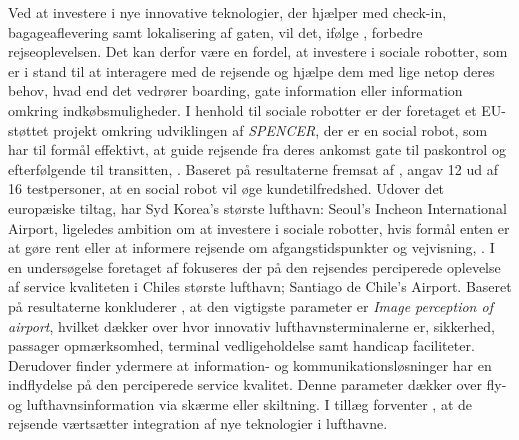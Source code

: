 Ved at investere i nye innovative teknologier, der hjælper med check-in, bagageaflevering samt lokalisering af gaten, vil det, ifølge \textcite[s. 352]{PDF:TheImpactOfTraveler}, forbedre rejseoplevelsen. Det kan derfor være en fordel, at investere i sociale robotter, som er i stand til at interagere med de rejsende og hjælpe dem med lige netop deres behov, hvad end det vedrører boarding, gate information eller information omkring indkøbsmuligheder. I henhold til sociale robotter er der foretaget et EU-støttet projekt omkring udviklingen af \textit{SPENCER}, der er en social robot, som har til formål effektivt, at guide rejsende fra deres ankomst gate til paskontrol og efterfølgende til transitten, \parencite[s. 609]{PDF:SpencerProject}. Baseret på resultaterne fremsat af \textcite[s. 150]{PDF:AGuideRobotAiport}, angav 12 ud af 16 testpersoner, at en social robot vil øge kundetilfredshed. Udover det europæiske tiltag, har Syd Korea's største lufthavn: Seoul’s Incheon International Airport, ligeledes ambition om at investere i sociale robotter, hvis formål enten er at gøre rent eller at informere rejsende om afgangstidspunkter og vejvisning, \parencite{WEB:LGsRobot}.\blankline   
%
I en undersøgelse foretaget af \textcite{PDF:CustomerPerceptionOfService} fokuseres der på den rejsendes perciperede oplevelse af service kvaliteten i Chiles største lufthavn; Santiago de Chile's Airport. Baseret på resultaterne konkluderer \textcite[s. 213]{PDF:CustomerPerceptionOfService}, at den vigtigste parameter er \textit{Image perception of airport}, hvilket dækker over hvor innovativ lufthavnsterminalerne er, sikkerhed, passager opmærksomhed, terminal vedligeholdelse samt handicap faciliteter. Derudover finder \textcite[s. 213]{PDF:CustomerPerceptionOfService} ydermere at information- og kommunikationsløsninger har en indflydelse på den perciperede service kvalitet. Denne parameter dækker over fly- og lufthavnsinformation via skærme eller skiltning. I tillæg forventer \textcite[s. 210]{PDF:CustomerPerceptionOfService}, at de rejsende værtsætter integration af nye teknologier i lufthavne.   

